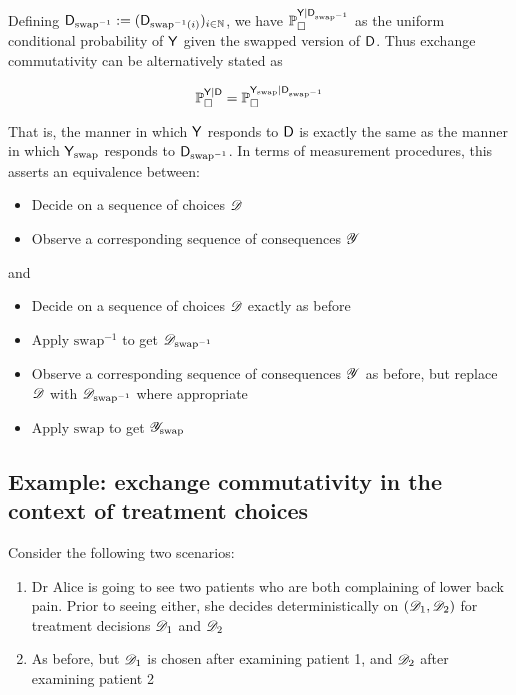 Defining $\mathsf{D}_{\text{swap}^{-1}}:=(\mathsf{D}_{\text{swap}^{-1}(i)})_{i\in\mathbb{N}}$, we have $\mathbb{P}_\square^{\mathsf{Y}|\mathsf{D}_{\text{swap}^{-1}}}$ as the uniform conditional probability of $\mathsf{Y}$ given the swapped version of $\mathsf{D}$. Thus exchange commutativity can be alternatively stated as

\begin{align}
    \mathbb{P}_\square^{\mathsf{Y}|\mathsf{D}} = \mathbb{P}_\square^{\mathsf{Y}_{\text{swap}}|\mathsf{D}_{\text{swap}^{-1}}}
\end{align}

That is, the manner in which $\mathsf{Y}$ responds to $\mathsf{D}$ is exactly the same as the manner in which $\mathsf{Y}_{\text{swap}}$ responds to $\mathsf{D}_{\text{swap}^{-1}}$. In terms of measurement procedures, this asserts an equivalence between:
\begin{itemize}
    \item Decide on a sequence of choices $\mathscr{D}$
    \item Observe a corresponding sequence of consequences $\mathscr{Y}$
\end{itemize}
and
\begin{itemize}
    \item Decide on a sequence of choices $\mathscr{D}$ exactly as before
    \item Apply $\text{swap}^{-1}$ to get $\mathscr{D}_{\text{swap}^{-1}}$
    \item Observe a corresponding sequence of consequences $\mathscr{Y}$ as before, but replace $\mathscr{D}$ with $\mathscr{D}_{\text{swap}^{-1}}$ where appropriate
    \item Apply $\text{swap}$ to get $\mathscr{Y}_{\text{swap}}$
\end{itemize}

\subsection{Example: exchange commutativity in the context of treatment choices}

Consider the following two scenarios:

\begin{enumerate}
    \item Dr Alice is going to see two patients who are both complaining of lower back pain. Prior to seeing either, she decides deterministically on $(\mathscr{D}_1,\mathscr{D}_2)$ for treatment decisions $\mathscr{D}_1$ and $\mathscr{D}_2$
    \item As before, but $\mathscr{D}_1$ is chosen after examining patient 1, and $\mathscr{D}_2$ after examining patient 2
\end{enumerate}

